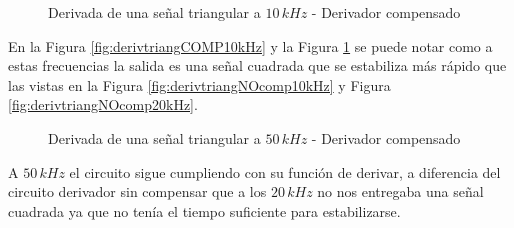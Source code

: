 \documentclass[11pt, a4paper]{article}
\begin{document}
\begin{figure}[H]
	\begin{center}
		\caption{Derivada de una señal triangular a $10 \,kHz$ - Derivador compensado}
		\label{fig:derivtriangCOMP20kHz}
	\end{center}
\end{figure}

En la Figura \ref{fig:derivtriangCOMP10kHz} y la Figura \ref{fig:derivtriangCOMP20kHz} se puede notar como a estas frecuencias la salida es una señal cuadrada que se estabiliza más rápido que las vistas en la Figura \ref{fig:derivtriangNOcomp10kHz} y Figura \ref{fig:derivtriangNOcomp20kHz}.

\begin{figure}[H]
	\begin{center}
		\caption{Derivada de una señal triangular a $50 \,kHz$ - Derivador compensado}
		\label{fig:derivtriangCOMP50kHz}
	\end{center}
\end{figure}

A $50 \, kHz$ el circuito sigue cumpliendo con su función de derivar, a diferencia del circuito derivador sin compensar que a los $20 \, kHz$ no nos entregaba una señal cuadrada ya que no tenía el tiempo suficiente para estabilizarse.
\end{document}
